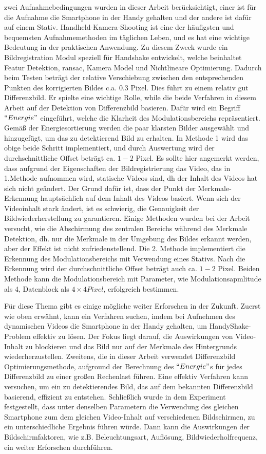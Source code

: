 zwei Aufnahmebedingungen wurden in dieser Arbeit berücksichtigt, einer ist für die Aufnahme die Smartphone in der Handy gehalten und der andere ist dafür auf einem Stativ. Handheld-Kamera-Shooting ist eine der häufigsten und bequemsten Aufnahmemethoden im täglichen Leben, und es hat eine wichtige Bedeutung in der praktischen Anwendung. Zu diesem Zweck wurde ein Bildregistration Modul speziell für Handshake entwickelt, welche beinhaltet Featur Detektion, \gls{ransac}, Kamera Model und Nichtlineare Optimierung. Dadurch beim Testen beträgt der relative Verschiebung zwischen den entsprechenden Punkten des korrigierten Bildes c.a. 0.3 Pixel. Dies führt zu einem relativ gut Differenzbild. Er spielte eine wichtige Rolle, while die beide Verfahren in diesem Arbeit auf der Detektion von Differenzbild basieren. Dafür wird ein Begriff $ ``Energie" $ eingeführt, welche die Klarheit des Modulationsbereichs repräsentiert. Gemäß der Energiesortierung werden die paar klarsten Bilder ausgewählt und hinzugefügt, um das zu detektierend Bild zu erhalten. In Methode 1 wird das obige beide Schritt implementiert, und durch Auswertung wird der durchschnittliche Offset beträgt ca. $ 1-2 $ Pixel. Es sollte hier angemerkt werden, dass aufgrund der Eigenschaften der Bildregistrierung das Video, das in 1.Methode aufnommen wird, statische Videos sind, dh der Inhalt des Videos hat sich nicht geändert. Der Grund dafür ist, dass der Punkt der Merkmale-Erkennung hauptsächlich auf dem Inhalt des Videos basiert. Wenn sich der Videoinhalt stark ändert, ist es schwierig, die Genauigkeit der Bildwiederherstellung zu garantieren. Einige Methoden wurden bei der Arbeit versucht, wie die Abschirmung des zentralen Bereichs während des Merkmale Detektion, dh. nur die Merkmale in der Umgebung des Bildes erkannt werden, aber der Effekt ist nicht zufriedenstellend. Die 2. Methode implementiert die Erkennung des Modulationsbereichs mit Verwendung eines Stativs. Nach die Erkennung wird der durchschnittliche Offset beträgt auch ca. $ 1-2 $ Pixel. Beiden Methode kann die Modulationsbereich mit Parameter, wie Modulationsapmlitude als 4, Datenblock als $ 4 \times 4 Pixel$, erfolgreich bestimmen. 

Für diese Thema gibt es einige mögliche weiter Erforschen in der Zukunft. Zuerst wie oben erwähnt, kann ein Verfahren suchen, imdem bei Aufnehmen des dynamischen Videos die Smartphone in der Handy gehalten, um HandyShake-Problem effektiv zu lösen. Der Fokus liegt darauf, die Auswirkungen von Video-Inhalt zu blockieren und das Bild nur auf der Merkmale des Hintergrunds wiederherzustellen. Zweitens, die in dieser Arbeit verwendet Differenzbild Optimierungsmethode, aufground der Berechnung des $ ``Energie" $s für jedes Differenzbild zu einer großen Rechenlast führen. Eine effektiv Verfahren kann versuchen, um ein zu detektierendes Bild, das auf dem bekannten Differenzbild basierend, effizient zu entstehen. Schließlich wurde in dem Experiment festgestellt, dass unter denselben Parametern die Verwendung des gleichen Smartphone zum dem gleichen Video-Inhalt auf verschiedenen Bildschirmen, zu ein unterschiedliche Ergebnis führen würde. Dann kann die Auswirkungen der Bildschirmfaktoren, wie z.B. Beleuchtungsart, Auflösung, Bildwiederholfrequenz, ein weiter Erforschen durchführen.




